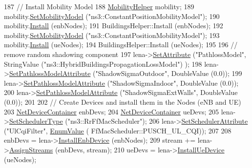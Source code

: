 \begin{DoxyCode}
187   \textcolor{comment}{// Install Mobility Model}
188   \hyperlink{classns3_1_1MobilityHelper}{MobilityHelper} mobility;
189   mobility.\hyperlink{classns3_1_1MobilityHelper_a030275011b6f40682e70534d30280aba}{SetMobilityModel} (\textcolor{stringliteral}{"ns3::ConstantPositionMobilityModel"});
190   mobility.\hyperlink{classns3_1_1MobilityHelper_a07737960ee95c0777109cf2994dd97ae}{Install} (enbNodes);
191   BuildingsHelper::Install (enbNodes);
192   mobility.\hyperlink{classns3_1_1MobilityHelper_a030275011b6f40682e70534d30280aba}{SetMobilityModel} (\textcolor{stringliteral}{"ns3::ConstantPositionMobilityModel"});
193   mobility.\hyperlink{classns3_1_1MobilityHelper_a07737960ee95c0777109cf2994dd97ae}{Install} (ueNodes);
194   BuildingsHelper::Install (ueNodes);
195   
196   \textcolor{comment}{// remove random shadowing component}
197   lena->\hyperlink{classns3_1_1ObjectBase_ac60245d3ea4123bbc9b1d391f1f6592f}{SetAttribute} (\textcolor{stringliteral}{"PathlossModel"}, StringValue (\textcolor{stringliteral}{"ns3::HybridBuildingsPropagationLossModel"})
      );
198   lena->\hyperlink{classns3_1_1LteHelper_aa96ebbd6845ca61c2b5e08e84481a348}{SetPathlossModelAttribute} (\textcolor{stringliteral}{"ShadowSigmaOutdoor"}, DoubleValue (0.0));
199   lena->\hyperlink{classns3_1_1LteHelper_aa96ebbd6845ca61c2b5e08e84481a348}{SetPathlossModelAttribute} (\textcolor{stringliteral}{"ShadowSigmaIndoor"}, DoubleValue (0.0));
200   lena->\hyperlink{classns3_1_1LteHelper_aa96ebbd6845ca61c2b5e08e84481a348}{SetPathlossModelAttribute} (\textcolor{stringliteral}{"ShadowSigmaExtWalls"}, DoubleValue (0.0));
201 
202   \textcolor{comment}{// Create Devices and install them in the Nodes (eNB and UE)}
203   \hyperlink{classns3_1_1NetDeviceContainer}{NetDeviceContainer} enbDevs;
204   \hyperlink{classns3_1_1NetDeviceContainer}{NetDeviceContainer} ueDevs;
205   lena->\hyperlink{classns3_1_1LteHelper_a8f86e55b8b80a81732c4b2df00fb25d5}{SetSchedulerType} (\textcolor{stringliteral}{"ns3::RrFfMacScheduler"});
206   lena->\hyperlink{classns3_1_1LteHelper_a38f8c7f4592b31c0f3dedb53e7909742}{SetSchedulerAttribute} (\textcolor{stringliteral}{"UlCqiFilter"}, \hyperlink{classns3_1_1EnumValue}{EnumValue} (
      FfMacScheduler::PUSCH\_UL\_CQI));
207   
208   enbDevs = lena->\hyperlink{classns3_1_1LteHelper_a5e009ad35ef85f46b5a6099263f15a03}{InstallEnbDevice} (enbNodes);
209   stream += lena->\hyperlink{classns3_1_1LteHelper_ae90d941582aa49a1b28c9301ece35b07}{AssignStreams} (enbDevs, stream);
210   ueDevs = lena->\hyperlink{classns3_1_1LteHelper_ac9cd932d7de92811cfa953c2e3b2fc9f}{InstallUeDevice} (ueNodes);

\end{DoxyCode}

